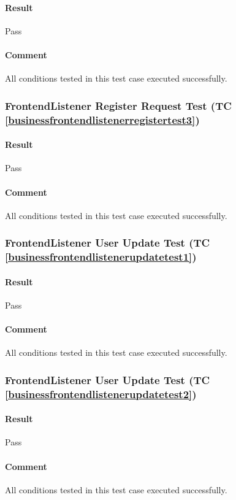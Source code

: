 \documentclass[hidelinks,english]{article}
\begin{document}
				\paragraph{Result} Pass
				\paragraph{Comment} All conditions tested in this test case executed successfully.
				
			\subsubsection{FrontendListener Register Request Test (TC \ref{businessfrontendlistenerregistertest3})}
				\paragraph{Result} Pass
				\paragraph{Comment} All conditions tested in this test case executed successfully.
				
			\subsubsection{FrontendListener User Update Test (TC \ref{businessfrontendlistenerupdatetest1})}
				\paragraph{Result} Pass
				\paragraph{Comment} All conditions tested in this test case executed successfully.
				
			\subsubsection{FrontendListener User Update Test (TC \ref{businessfrontendlistenerupdatetest2})}
				\paragraph{Result} Pass
				\paragraph{Comment} All conditions tested in this test case executed successfully.
				
\end{document}
